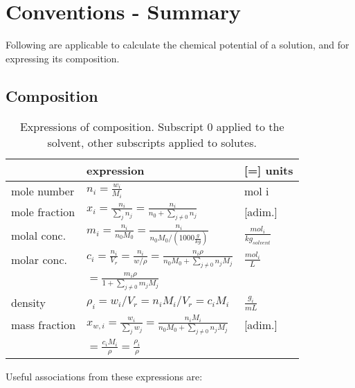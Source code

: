\documentclass[onecolumn]{article}
\begin{document}
\section{Conventions - Summary} %
Following are applicable to calculate the chemical potential of a solution, and for expressing its composition.
\label{sec:conventions}
\subsection{Composition}
\label{subsec:composition}
\begin{table}[h]
\begin{tabular}{|lll|}
\hline
		      & expression                                                                                    & [=] units                     \\
\hline
mole number   & $n_i = \frac{w_i}{M_i}$                                                                                   & mol i                         \\
mole fraction & $x_i = \frac{n_i}{\sum_j{n_j}} =  \frac{n_i}{n_0 + \sum_{j \neq 0}{n_j}}$                         & [adim.]                       \\
molal  conc.  & $m_i = \frac{n_i}{n_0 M_0} = \frac{n_i}{n_0 M_0 / \left(1000 \frac{g}{kg} \right)}$               & $\frac{mol_i} {kg_{solvent}}$ \\
molar  conc.  & $c_i = \frac{n_i}{V_r} = \frac{n_i}{w/\rho} = \frac{n_i \rho}{n_0 M_0 + \sum_{j\neq 0}{n_j M_j}}$ & $\frac{mol_i}{L}$\\ 
              & $= \frac{m_i \rho}{1 + \sum_{j\neq 0}{m_j M_j}}$     &       \\
density 	  & $\rho_i = w_i/V_r = n_i M_i/V_r = c_i M_i$			 &	$\frac{g_i}{mL}$ \\
mass fraction & $x_{w,i} = \frac{w_i}{\sum_j{w_j}} =  \frac{n_i M_i}{n_0 M_0 + \sum_{j \neq 0}{n_j M_j}}$                         & [adim.]                       \\
			  & $= \frac{c_i M_i}{\rho} = \frac{\rho_i}{\rho}$  &  \\
\hline
\end{tabular}
\caption{Expressions of composition. Subscript 0 applied to the solvent, other subscripts applied to solutes.}
\label{table:composition_expr}
\end{table}
Useful associations from these expressions are: \\
\end{document}
